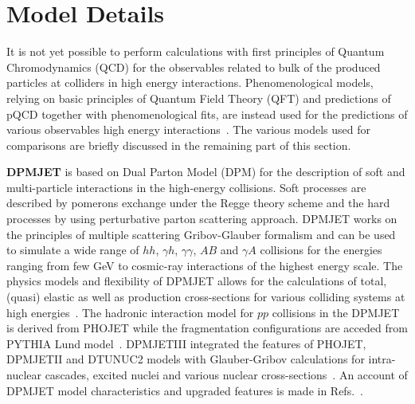 \documentclass{article}
\begin{document}
\section{Model Details}\label{sec2}
 It is not yet possible to perform calculations with first principles of Quantum Chromodynamics (QCD) for the observables related to bulk of the produced particles at colliders in high energy interactions. Phenomenological models, relying on basic principles of Quantum Field Theory (QFT) and predictions of pQCD together with phenomenological fits, are instead used for the predictions of various observables high energy interactions~\cite{dEnterria:2011twh}. The various models used for comparisons are briefly discussed in the remaining part of this section.

{\bf DPMJET} is based on Dual Parton Model (DPM) for the description of soft and multi-particle interactions in the high-energy collisions. Soft processes are described by pomerons exchange under the Regge theory scheme and the hard processes by using perturbative parton scattering approach. DPMJET works on the principles of multiple scattering Gribov-Glauber formalism and can be used to simulate a wide range of $hh$, $\gamma h$, $\gamma \gamma$, $AB$ and $\gamma A$ collisions for the energies ranging from few GeV to cosmic-ray interactions of the highest energy scale. The physics models and flexibility of DPMJET allows for the calculations of total, (quasi) elastic as well as production cross-sections for various colliding systems at high energies~\cite{Roesler:2000he}. The hadronic interaction model for $pp$ collisions in the DPMJET is derived from PHOJET while the fragmentation configurations are acceded from PYTHIA Lund model~\cite{ATLAS:2020bhl}. DPMJETIII integrated the features of PHOJET, DPMJETII and DTUNUC2 models with Glauber-Gribov calculations for intra-nuclear cascades, excited nuclei and various nuclear cross-sections~\cite{Roesler:2000he}. An account of DPMJET model characteristics and upgraded features is made in Refs.~\cite{Roesler:2000he, Bopp:2005cr}. 
\end{document}
